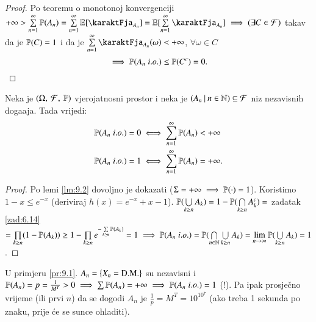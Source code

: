 \begin{proof}
    Po teoremu o monotonoj konvergenciji
    $+\infty > \suma{n = 1}{\infty} \vjeroj{A_n} = \suma{n = 1}{\infty} \masE [ \karaktFja_{A_n} ] = \masE [\suma{n = 1}{\infty} \karaktFja_{A_n}] \implies (\exists C \in \famF)$ takav da je $\mathbb{P}({C}) = 1$ i da je $\suma{n = 1}{\infty} \karaktFja_{A_n}(\omega) < +\infty$, $\forall \omega \in C$
    \begin{equation*}
        \implies \mathbb{P}({A_n \; i.o.}) \leq \mathbb{P}({C^c}) = 0. 
    \end{equation*}
\end{proof}

\begin{tm}   \label{tm:9.3}
    Neka je $(\Omega, \: \mathcal{F}, \: \mathbb{P})$ vjerojatnosni prostor i neka je $({A_n} \: | \: {n \in \mathbb{N}}) \subseteq \mathcal{F}$ niz nezavisnih doga\dj aja.
    Tada vrijedi:
    \begin{equation*}
        \begin{aligned}
            \mathbb{P}({A_n \; i.o.}) = 0 &\iff \sum\limits_{n = 1}^{\infty} \mathbb{P}({A_n}) < +\infty\\
            \mathbb{P}({A_n \; i.o.}) = 1 &\iff \sum\limits_{n = 1}^{\infty} \mathbb{P}({A_n}) = +\infty.
        \end{aligned}
    \end{equation*}
\end{tm}

\begin{proof}
    Po lemi \ref{lm:9.2} dovoljno je dokazati ($\Sigma = + \infty \implies \mathbb{P}({\cdot}) = 1$).
    Koristimo $1 - x \leq e^{-x}$ (deriviraj $h(x) = e^{-x} + x - 1$).
    $\mathbb{P}({\bigcup\limits_{k \geq n}^{} A_k}) = 1 - \mathbb{P}({\bigcap\limits_{k \geq n}^{} A_k^c}) = $ zadatak \ref{zad:6.14} $= \prod\limits_{k \geq n}^{} (1 - \mathbb{P}({A_k})) \geq 1 - \prod\limits_{k \geq n}^{} e^{-\sum\limits_{k \geq n}^{} \mathbb{P}({A_k})} = 1 \implies \mathbb{P}({A_n \; i.o.}) = \mathbb{P}({\bigcap\limits_{n \in \mathbb{N}}^{} \bigcup\limits_{k \geq n}^{} A_k}) = \lim\limits_{n \to \infty} \mathbb{P}({\bigcup\limits_{k \geq n}^{} A_k}) = 1$.
\end{proof}

\begin{nap} \label{nap:9.4}
    U primjeru \ref{pr:9.1}. $A_n = \{ X_n = \textnormal{D.M.} \}$ su nezavisni i $\mathbb{P}({A_n}) = p = \frac{1}{M^T} > 0 \implies \sum \mathbb{P}({A_n}) = +\infty \implies \mathbb{P}({A_n \; i.o.}) = 1$ (!).
    Pa ipak prosje\v cno vrijeme (ili prvi $n$) da se dogodi $A_n$ je $\frac{1}{p} = M^T = 10^{10^7}$ (ako treba 1 sekunda po znaku, prije \' ce se sunce ohladiti).
\end{nap}

